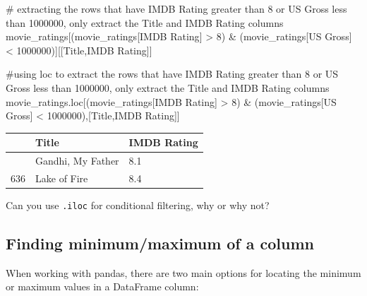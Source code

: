 \documentclass[
  letterpaper,
  DIV=11,
  numbers=noendperiod]{scrreprt}
\newenvironment{Shaded}{\begin{snugshade}}{\end{snugshade}}
\newcommand{\CommentTok}[1]{\textcolor[rgb]{0.37,0.37,0.37}{#1}}
\newcommand{\DecValTok}[1]{\textcolor[rgb]{0.68,0.00,0.00}{#1}}
\newcommand{\NormalTok}[1]{\textcolor[rgb]{0.00,0.23,0.31}{#1}}
\newcommand{\OperatorTok}[1]{\textcolor[rgb]{0.37,0.37,0.37}{#1}}
\newcommand{\StringTok}[1]{\textcolor[rgb]{0.13,0.47,0.30}{#1}}
\begin{document}
\begin{Shaded}
\begin{Highlighting}[]
\CommentTok{\# extracting the rows that have IMDB Rating greater than 8 or US Gross less than 1000000, only extract the Title and IMDB Rating columns}
\NormalTok{movie\_ratings[(movie\_ratings[}\StringTok{\textquotesingle{}IMDB Rating\textquotesingle{}}\NormalTok{] }\OperatorTok{\textgreater{}} \DecValTok{8}\NormalTok{) }\OperatorTok{\&}\NormalTok{ (movie\_ratings[}\StringTok{\textquotesingle{}US Gross\textquotesingle{}}\NormalTok{] }\OperatorTok{\textless{}} \DecValTok{1000000}\NormalTok{)][[}\StringTok{\textquotesingle{}Title\textquotesingle{}}\NormalTok{,}\StringTok{\textquotesingle{}IMDB Rating\textquotesingle{}}\NormalTok{]]}

\CommentTok{\#using loc to extract the rows that have IMDB Rating greater than 8 or US Gross less than 1000000, only extract the Title and IMDB Rating columns}
\NormalTok{movie\_ratings.loc[(movie\_ratings[}\StringTok{\textquotesingle{}IMDB Rating\textquotesingle{}}\NormalTok{] }\OperatorTok{\textgreater{}} \DecValTok{8}\NormalTok{) }\OperatorTok{\&}\NormalTok{ (movie\_ratings[}\StringTok{\textquotesingle{}US Gross\textquotesingle{}}\NormalTok{] }\OperatorTok{\textless{}} \DecValTok{1000000}\NormalTok{),[}\StringTok{\textquotesingle{}Title\textquotesingle{}}\NormalTok{,}\StringTok{\textquotesingle{}IMDB Rating\textquotesingle{}}\NormalTok{]]}
\end{Highlighting}
\end{Shaded}

\begin{longtable}[]{@{}lll@{}}
\toprule\noalign{}
& Title & IMDB Rating \\
\midrule\noalign{}
\endhead
\bottomrule\noalign{}
\endlastfoot
21 & Gandhi, My Father & 8.1 \\
636 & Lake of Fire & 8.4 \\
\end{longtable}

Can you use \texttt{.iloc} for conditional filtering, why or why not?

\hypertarget{finding-minimummaximum-of-a-column}{%
\subsection{Finding minimum/maximum of a
column}\label{finding-minimummaximum-of-a-column}}

When working with pandas, there are two main options for locating the
minimum or maximum values in a DataFrame column:
\end{document}
